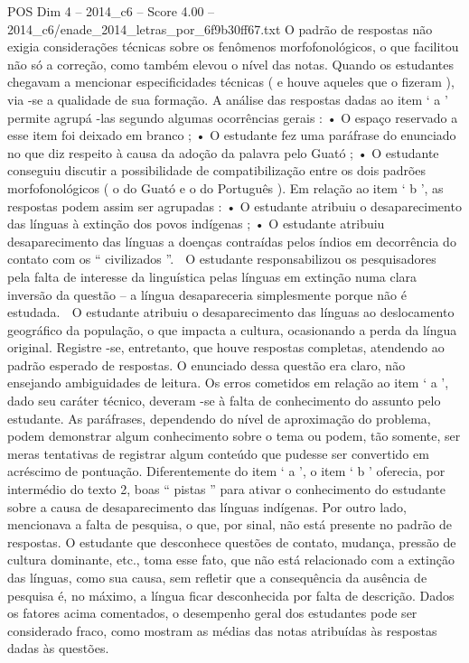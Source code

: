 \begin{textsample}{POS Dim 4 – 2014\_c6 – Score 4.00 – 2014\_c6/enade\_2014\_letras\_por\_6f9b30ff67.txt}
O padrão de respostas não exigia considerações técnicas sobre os fenômenos morfofonológicos, o que facilitou não só a correção, como também elevou o nível das notas.
Quando os estudantes chegavam a mencionar especificidades técnicas ( e houve aqueles que o fizeram ), via -se a qualidade de sua formação.
A análise das respostas dadas ao item ‘ a ’ permite agrupá -las segundo algumas ocorrências gerais : • O espaço reservado a esse item foi deixado em branco ; • O estudante fez uma paráfrase do enunciado no que diz respeito à causa da adoção da palavra pelo Guató ; • O estudante conseguiu discutir a possibilidade de compatibilização entre os dois padrões morfofonológicos ( o do Guató e o do Português ).
Em relação ao item ‘ b ’, as respostas podem assim ser agrupadas : • O estudante atribuiu o desaparecimento das línguas à extinção dos povos indígenas ; • O estudante atribuiu desaparecimento das línguas a doenças contraídas pelos índios em decorrência do contato com os “ civilizados ”.  O estudante responsabilizou os pesquisadores pela falta de interesse da linguística pelas línguas em extinção numa clara inversão da questão – a língua desapareceria simplesmente porque não é estudada.  O estudante atribuiu o desaparecimento das línguas ao deslocamento geográfico da população, o que impacta a cultura, ocasionando a perda da língua original.
Registre -se, entretanto, que houve respostas completas, atendendo ao padrão esperado de respostas.
O enunciado dessa questão era claro, não ensejando ambiguidades de leitura.
Os erros cometidos em relação ao item ‘ a ’, dado seu caráter técnico, deveram -se à falta de conhecimento do assunto pelo estudante.
As paráfrases, dependendo do nível de aproximação do problema, podem demonstrar algum conhecimento sobre o tema ou podem, tão somente, ser meras tentativas de registrar algum conteúdo que pudesse ser convertido em acréscimo de pontuação.
Diferentemente do item ‘ a ’, o item ‘ b ’ oferecia, por intermédio do texto 2, boas “ pistas ” para ativar o conhecimento do estudante sobre a causa de desaparecimento das línguas indígenas.
Por outro lado, mencionava a falta de pesquisa, o que, por sinal, não está presente no padrão de respostas.
O estudante que desconhece questões de contato, mudança, pressão de cultura dominante, etc., toma esse fato, que não está relacionado com a extinção das línguas, como sua causa, sem refletir que a consequência da ausência de pesquisa é, no máximo, a língua ficar desconhecida por falta de descrição.
Dados os fatores acima comentados, o desempenho geral dos estudantes pode ser considerado fraco, como mostram as médias das notas atribuídas às respostas dadas às questões.

\end{textsample}
